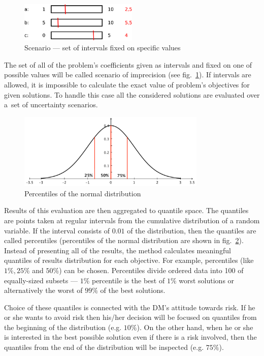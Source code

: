 \begin{figure}
  \centering \includegraphics[width=0.5\textwidth]{img/scenario}
  \caption{Scenario --- set of intervals fixed on specific values}
  \label{scenario}
\end{figure}

The set of all of the problem's coefficients given as intervals and fixed on
one of possible values will be called scenario of imprecision (see
fig.~\ref{scenario}). If intervals are allowed, it is impossible to calculate
the exact value of problem's objectives for given solutions. To handle this
case all the considered solutions are evaluated over a~set of uncertainty
scenarios.

\begin{figure}
  \centering \includegraphics[width=0.8\textwidth]{img/percentile}
  \caption{Percentiles of the normal distribution}
  \label{percentiles}
\end{figure}

 Results of this evaluation are then aggregated to quantile space. The
 quantiles are points taken at regular intervals from the cumulative
 distribution of a random variable. If the interval consists of $0.01$ of the
 distribution, then the quantiles are called percentiles (percentiles of the
 normal distribution are shown in fig.~\ref{percentiles}). Instead of
 presenting all of the results, the method calculates meaningful quantiles of
 results distribution for each objective. For example, percentiles (like $1\%,
 25\%$ and $50\%$) can be chosen. Percentiles divide ordered data into 100 of
 equally-sized subsets --- $1\%$ percentile is the best of $1\%$ worst
 solutions or alternatively the worst of $99\%$ of the best solutions.

Choice of these quantiles is connected with the DM's attitude towards risk. If
he or she wants to avoid risk then his/her decision will be focused on
quantiles from the beginning of the distribution (e.g. $10\%$). On the other
hand, when he or she is interested in the best possible solution even if there
is a risk involved, then the quantiles from the end of the distribution will
be inspected (e.g. $75\%$).

